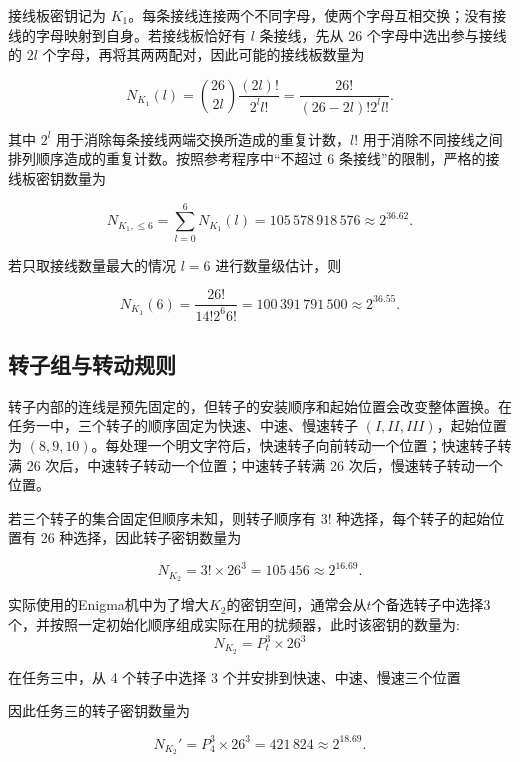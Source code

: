 接线板密钥记为 $K_1$。每条接线连接两个不同字母，使两个字母互相交换；没有接线的字母映射到自身。若接线板恰好有 $l$ 条接线，先从 26 个字母中选出参与接线的 $2l$ 个字母，再将其两两配对，因此可能的接线板数量为

\begin{equation*}
    N_{K_1}(l)=\binom{26}{2l}\frac{(2l)!}{2^l l!}
    =\frac{26!}{(26-2l)!2^l l!}.
\end{equation*}

其中 $2^l$ 用于消除每条接线两端交换所造成的重复计数，$l!$ 用于消除不同接线之间排列顺序造成的重复计数。按照参考程序中“不超过 6 条接线”的限制，严格的接线板密钥数量为

\begin{equation*}
    N_{K_1,\leq 6}=\sum_{l=0}^{6}N_{K_1}(l)
    =105\,578\,918\,576\approx2^{36.62}.
\end{equation*}

若只取接线数量最大的情况 $l=6$ 进行数量级估计，则

\begin{equation*}
    N_{K_1}(6)=\frac{26!}{14!2^6 6!}
    =100\,391\,791\,500\approx2^{36.55}.
\end{equation*}

\subsection{转子组与转动规则}

转子内部的连线是预先固定的，但转子的安装顺序和起始位置会改变整体置换。在任务一中，三个转子的顺序固定为快速、中速、慢速转子 $(I,II,III)$，起始位置为 $(8,9,10)$。每处理一个明文字符后，快速转子向前转动一个位置；快速转子转满 26 次后，中速转子转动一个位置；中速转子转满 26 次后，慢速转子转动一个位置。

若三个转子的集合固定但顺序未知，则转子顺序有 $3!$ 种选择，每个转子的起始位置有 26 种选择，因此转子密钥数量为

\begin{equation*}
    N_{K_2}=3!\times26^3=105\,456\approx2^{16.69}.
\end{equation*}

实际使用的Enigma机中为了增大$K_2$的密钥空间，通常会从$t$个备选转子中选择$3$个，并按照一定初始化顺序组成实际在用的扰频器，此时该密钥的数量为:
\begin{equation*}
    N_{K_2}  =  P_t^3 \times 26^3
\end{equation*}

在任务三中，从 4 个转子中选择 3 个并安排到快速、中速、慢速三个位置

因此任务三的转子密钥数量为

\begin{equation*}
    N_{K_2}'=P_4^3\times26^3=421\,824\approx2^{18.69}.
\end{equation*}
